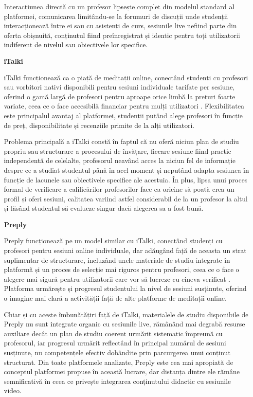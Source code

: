 Interacțiunea directă cu un profesor lipsește complet din modelul standard al platformei, comunicarea limitându-se la forumuri de discuții unde studenții interacționează între ei sau cu asistenți de curs, sesiunile live nefiind parte din oferta obișnuită, conținutul fiind preînregistrat și identic pentru toți utilizatorii indiferent de nivelul sau obiectivele lor specifice.

\textbf{iTalki}

iTalki funcționează ca o piață de meditații online, conectând studenți cu profesori sau vorbitori nativi disponibili pentru sesiuni individuale tarifate per sesiune, oferind o gamă largă de profesori pentru aproape orice limbă la prețuri foarte variate, ceea ce o face accesibilă financiar pentru mulți utilizatori \cite{italki}. Flexibilitatea este principalul avantaj al platformei, studenții putând alege profesori în funcție de preț, disponibilitate și recenziile primite de la alți utilizatori.

Problema principală a iTalki constă în faptul că nu oferă niciun plan de studiu propriu sau structurare a procesului de învățare, fiecare sesiune fiind practic independentă de celelalte, profesorul neavând acces la niciun fel de informație despre ce a studiat studentul până în acel moment și neputând adapta sesiunea în funcție de lacunele sau obiectivele specifice ale acestuia. În plus, lipsa unui proces formal de verificare a calificărilor profesorilor face ca oricine să poată crea un profil și oferi sesiuni, calitatea variind astfel considerabil de la un profesor la altul și lăsând studentul să evalueze singur dacă alegerea sa a fost bună.

\textbf{Preply}

Preply funcționează pe un model similar cu iTalki, conectând studenți cu profesori pentru sesiuni online individuale, dar adăugând față de aceasta un strat suplimentar de structurare, incluzând unele materiale de studiu integrate în platformă și un proces de selecție mai riguros pentru profesori, ceea ce o face o alegere mai sigură pentru utilizatorii care vor să lucreze cu cineva verificat \cite{preply}. Platforma urmărește și progresul studentului la nivel de sesiuni susținute, oferind o imagine mai clară a activității față de alte platforme de meditații online.

Chiar și cu aceste îmbunătățiri față de iTalki, materialele de studiu disponibile de Preply nu sunt integrate organic cu sesiunile live, rămânând mai degrabă resurse auxiliare decât un plan de studiu coerent urmărit sistematic împreună cu profesorul, iar progresul urmărit reflectând în principal numărul de sesiuni susținute, nu competențele efectiv dobândite prin parcurgerea unui conținut structurat. Din toate platformele analizate, Preply este cea mai apropiată de conceptul platformei propuse în această lucrare, dar distanța dintre ele rămâne semnificativă în ceea ce privește integrarea conținutului didactic cu sesiunile video.

